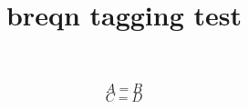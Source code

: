 \documentclass{article}
\title{breqn tagging test}
\begin{document}
\begin{dmath}
A=B
\end{dmath}
\begin{dmath}
C=D
\end{dmath}
\end{document}
